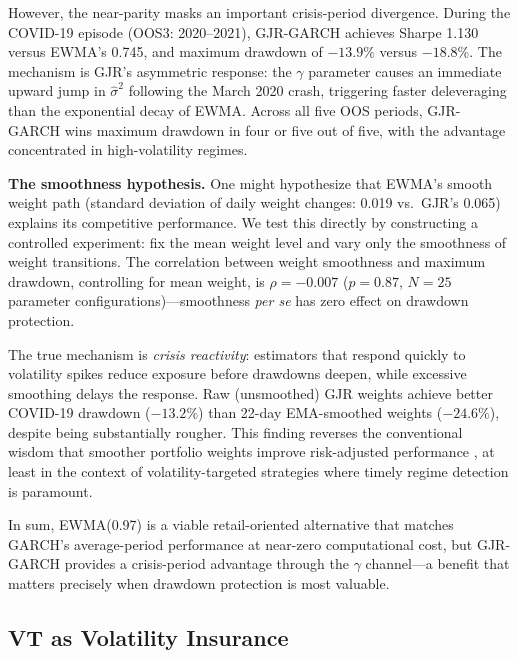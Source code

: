 However, the near-parity masks an important crisis-period divergence. During the COVID-19 episode (OOS3: 2020--2021), GJR-GARCH achieves Sharpe 1.130 versus EWMA's 0.745, and maximum drawdown of $-13.9\%$ versus $-18.8\%$. The mechanism is GJR's asymmetric response: the $\gamma$ parameter causes an immediate upward jump in $\hat{\sigma}^2$ following the March 2020 crash, triggering faster deleveraging than the exponential decay of EWMA. Across all five OOS periods, GJR-GARCH wins maximum drawdown in four or five out of five, with the advantage concentrated in high-volatility regimes.

\textbf{The smoothness hypothesis.} One might hypothesize that EWMA's smooth weight path (standard deviation of daily weight changes: 0.019 vs.\ GJR's 0.065) explains its competitive performance. We test this directly by constructing a controlled experiment: fix the mean weight level and vary only the smoothness of weight transitions. The correlation between weight smoothness and maximum drawdown, controlling for mean weight, is $\rho = -0.007$ ($p = 0.87$, $N = 25$ parameter configurations)---smoothness \textit{per se} has zero effect on drawdown protection.

The true mechanism is \textit{crisis reactivity}: estimators that respond quickly to volatility spikes reduce exposure before drawdowns deepen, while excessive smoothing delays the response. Raw (unsmoothed) GJR weights achieve better COVID-19 drawdown ($-13.2\%$) than 22-day EMA-smoothed weights ($-24.6\%$), despite being substantially rougher. This finding reverses the conventional wisdom that smoother portfolio weights improve risk-adjusted performance \citep[cf.][]{fleming2001}, at least in the context of volatility-targeted strategies where timely regime detection is paramount.

In sum, EWMA(0.97) is a viable retail-oriented alternative that matches GARCH's average-period performance at near-zero computational cost, but GJR-GARCH provides a crisis-period advantage through the $\gamma$ channel---a benefit that matters precisely when drawdown protection is most valuable.



\subsection{VT as Volatility Insurance}
\label{sec:vt_insurance}

